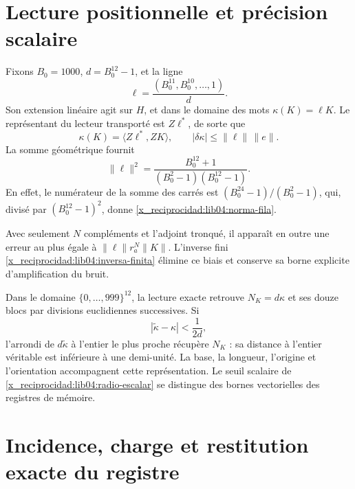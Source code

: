 \section{Lecture positionnelle et précision scalaire}
\label{x_reciprocidad:lib04:kappa}

Fixons \(B_0=1000\), \(d=B_0^{12}-1\), et la ligne
\begin{equation}
 \ell=\frac{(B_0^{11},B_0^{10},\ldots,1)}{d}.
 \label{x_reciprocidad:lib04:fila-posicional}
\end{equation}
Son extension linéaire agit sur \(H\), et dans le domaine des mots \(\kappa(K)=\ell K\). Le représentant du lecteur transporté est \(Z\ell^*\), de sorte que
\begin{equation}
 \kappa(K)=\langle Z\ell^*,ZK\rangle,\qquad
 |\delta\kappa|\leq\|\ell\|\,\|e\|.
 \label{x_reciprocidad:lib04:lectura-kappa}
\end{equation}
La somme géométrique fournit
\begin{equation}
 \|\ell\|^2
 =\frac{B_0^{12}+1}{(B_0^2-1)(B_0^{12}-1)}.
 \label{x_reciprocidad:lib04:norma-fila}
\end{equation}
En effet, le numérateur de la somme des carrés est
\((B_0^{24}-1)/(B_0^2-1)\), qui, divisé par
\((B_0^{12}-1)^2\), donne \eqref{x_reciprocidad:lib04:norma-fila}.

Avec seulement \(N\) compléments et l’adjoint tronqué, il apparaît en outre
une erreur au plus égale à \(\|\ell\|r_a^N\|K\|\). L’inverse fini
\eqref{x_reciprocidad:lib04:inversa-finita} élimine ce biais et conserve sa borne
explicite d’amplification du bruit.

Dans le domaine \(\{0,\ldots,999\}^{12}\), la lecture exacte
retrouve \(N_K=d\kappa\) et ses douze blocs par divisions
euclidiennes successives. Si
\begin{equation}
 |\widetilde\kappa-\kappa|<\frac1{2d},
 \label{x_reciprocidad:lib04:radio-escalar}
\end{equation}
l'arrondi de \(d\widetilde\kappa\) à l'entier le plus proche récupère \(N_K\) : sa distance à l'entier véritable est inférieure à une demi-unité. La base, la longueur, l'origine et l'orientation accompagnent cette représentation. Le seuil scalaire de \eqref{x_reciprocidad:lib04:radio-escalar} se distingue des bornes vectorielles des registres de mémoire.

\section{Incidence, charge et restitution exacte du registre}
\label{x_reciprocidad:lib04:incidencia}

